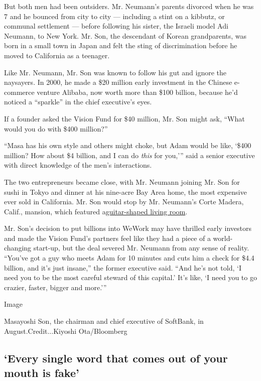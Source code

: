 But both men had been outsiders. Mr. Neumann's parents divorced when he
was 7 and he bounced from city to city --- including a stint on a
kibbutz, or communal settlement --- before following his sister, the
Israeli model Adi Neumann, to New York. Mr. Son, the descendant of
Korean grandparents, was born in a small town in Japan and felt the
sting of discrimination before he moved to California as a teenager.

Like Mr. Neumann, Mr. Son was known to follow his gut and ignore the
naysayers. In 2000, he made a \$20 million early investment in the
Chinese e-commerce venture Alibaba, now worth more than \$100 billion,
because he'd noticed a ``sparkle'' in the chief executive's eyes.

If a founder asked the Vision Fund for \$40 million, Mr. Son might ask,
``What would you do with \$400 million?''

``Masa has his own style and others might choke, but Adam would be like,
`\$400 million? How about \$4 billion, and I can do \emph{this} for
you,''' said a senior executive with direct knowledge of the men's
interactions.

The two entrepreneurs became close, with Mr. Neumann joining Mr. Son for
sushi in Tokyo and dinner at his nine-acre Bay Area home, the most
expensive ever sold in California. Mr. Son would stop by Mr. Neumann's
Corte Madera, Calif., mansion, which featured
a\href{https://www.wsj.com/articles/wework-founder-adam-neumanns-trove-of-pricey-properties-11570730254}{guitar-shaped
living room}.

Mr. Son's decision to put billions into WeWork may have thrilled early
investors and made the Vision Fund's partners feel like they had a piece
of a world-changing start-up, but the deal severed Mr. Neumann from any
sense of reality. ``You've got a guy who meets Adam for 10 minutes and
cuts him a check for \$4.4 billion, and it's just insane,'' the former
executive said. ``And he's not told, `I need you to be the most careful
steward of this capital.' It's like, `I need you to go crazier, faster,
bigger and more.'''

Image

Masayoshi Son, the chairman and chief executive of SoftBank, in
August.Credit...Kiyoshi Ota/Bloomberg

\hypertarget{every-single-word-that-comes-out-of-your-mouth-is-fake}{%
\subsection{`Every single word that comes out of your mouth is
fake'}\label{every-single-word-that-comes-out-of-your-mouth-is-fake}}

